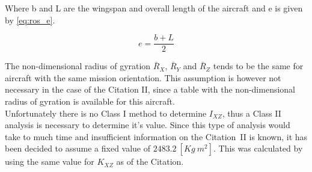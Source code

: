 Where b and L are the wingspan and overall length of the aircraft and e is given by \autoref{eq:ros_e}.

\begin{equation}
    \label{eq:ros_e}
    e = \frac{{b + L}}{2}
\end{equation}

The non-dimensional radius of gyration $\bar{R}_X$, $\bar{R}_Y$ and $\bar{R}_Z$ tends to be the same for aircraft with the same mission orientation. This assumption is however not necessary in the case of the Citation II, since a table with the non-dimensional radius of gyration is available for this aircraft.\cite{roskam_5}\\

Unfortunately there is no Class I method to determine $I_{XZ}$, thus a Class II analysis is necessary to determine it's value. Since this type of analysis would take to much time and insufficient information on the Citation~II is known, it has been decided to assume a fixed value of $2483.2\ [Kg\ m^2]$. This was calculated by using the same value for $K_{XZ}$ as of the Citation.
























































